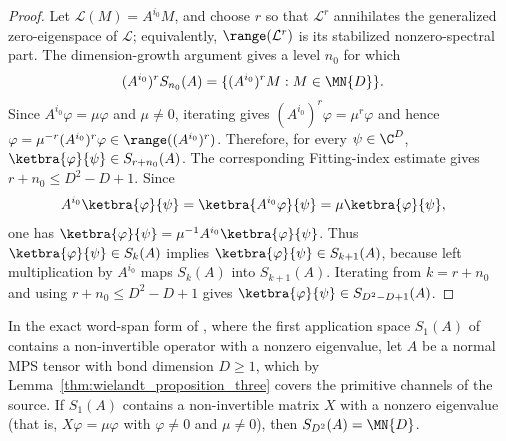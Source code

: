 \begin{proof}
    \leanok
    Let $\mathcal L(M)=A^{i_0}M$, and choose $r$ so that
    $\mathcal L^r$ annihilates the generalized zero-eigenspace of $\mathcal L$;
    equivalently, $\range(\mathcal L^r)$ is its stabilized nonzero-spectral
    part. The dimension-growth argument gives a level $n_0$ for which
    \begin{align}
        (A^{i_0})^rS_{n_0}(A)
         & =\{(A^{i_0})^rM:M\in\MN{D}\}.
        \notag
    \end{align}
    Since $A^{i_0}\varphi=\mu\varphi$ and $\mu\neq0$, iterating gives
    $(A^{i_0})^r\varphi=\mu^r\varphi$ and hence
    $\varphi=\mu^{-r}(A^{i_0})^r\varphi\in\range((A^{i_0})^r)$.
    Therefore, for every $\psi\in\C^D$,
    $\ketbra{\varphi}{\psi}\in S_{r+n_0}(A)$.
    The corresponding Fitting-index estimate gives
    $r+n_0\le D^2-D+1$.
    Since
    \begin{align}
        A^{i_0}\ketbra{\varphi}{\psi}
         & =\ketbra{A^{i_0}\varphi}{\psi}
        =\mu\ketbra{\varphi}{\psi},
        \notag
    \end{align}
    one has
    $\ketbra{\varphi}{\psi}
        =\mu^{-1}A^{i_0}\ketbra{\varphi}{\psi}$.
    Thus
    $\ketbra{\varphi}{\psi}\in S_k(A)$ implies
    $\ketbra{\varphi}{\psi}\in S_{k+1}(A)$, because left multiplication
    by $A^{i_0}$ maps $S_k(A)$ into $S_{k+1}(A)$.
    Iterating from $k=r+n_0$ and using $r+n_0\le D^2-D+1$ gives
    $\ketbra{\varphi}{\psi}\in S_{D^2-D+1}(A)$.
\end{proof}

\begin{lemma}%
    \label{thm:wielandt_case3_one_step_span}
    \leanok
    In the exact word-span form of \cite[Theorem~1, case~(3)]{Sanz2010Quantum},
    where the first application space $S_1(A)$ of~\cite{Sanz2010Quantum}
    contains a non-invertible operator with a nonzero eigenvalue, let $A$ be a
    normal MPS tensor with bond dimension $D\ge1$, which by
    Lemma~\ref{thm:wielandt_proposition_three} covers the primitive channels
    of the source. If $S_1(A)$ contains a
    non-invertible matrix $X$ with a nonzero eigenvalue (that is,
    $X\varphi=\mu\varphi$ with $\varphi\neq0$ and $\mu\neq0$), then
    $S_{D^2}(A)=\MN{D}$.
\end{lemma}

